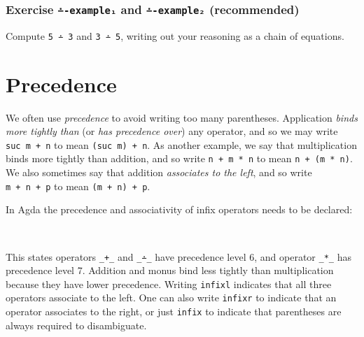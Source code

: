 \hypertarget{Naturals-monus-examples}{%
\subsubsection{\texorpdfstring{Exercise \texttt{∸-example₁} and
\texttt{∸-example₂}
(recommended)}{Exercise ∸-example₁ and ∸-example₂ (recommended)}}\label{Naturals-monus-examples}}

Compute \texttt{5\ ∸\ 3} and \texttt{3\ ∸\ 5}, writing out your
reasoning as a chain of equations.

\begin{fence}
\begin{code}%
\>[0]\<%
\end{code}
\end{fence}

\hypertarget{precedence}{%
\section{Precedence}\label{precedence}}

We often use \emph{precedence} to avoid writing too many parentheses.
Application \emph{binds more tightly than} (or \emph{has precedence
over}) any operator, and so we may write \texttt{suc\ m\ +\ n} to mean
\texttt{(suc\ m)\ +\ n}. As another example, we say that multiplication
binds more tightly than addition, and so write \texttt{n\ +\ m\ *\ n} to
mean \texttt{n\ +\ (m\ *\ n)}. We also sometimes say that addition
\emph{associates to the left}, and so write \texttt{m\ +\ n\ +\ p} to
mean \texttt{(m\ +\ n)\ +\ p}.

In Agda the precedence and associativity of infix operators needs to be
declared:

\begin{fence}
\begin{code}%
\>[0]\AgdaSpace{}%
%
\>[10]\AgdaOperator{\AgdaPrimitive{\AgdaUnderscore{}+\AgdaUnderscore{}}}%
\>[15]\<%
\\
\>[0]\AgdaSpace{}%
%
\>[10]\AgdaOperator{\AgdaPrimitive{\AgdaUnderscore{}*\AgdaUnderscore{}}}\<%
\end{code}
\end{fence}

This states operators \texttt{\_+\_} and \texttt{\_∸\_} have precedence
level 6, and operator \texttt{\_*\_} has precedence level 7. Addition
and monus bind less tightly than multiplication because they have lower
precedence. Writing \texttt{infixl} indicates that all three operators
associate to the left. One can also write \texttt{infixr} to indicate
that an operator associates to the right, or just \texttt{infix} to
indicate that parentheses are always required to disambiguate.

